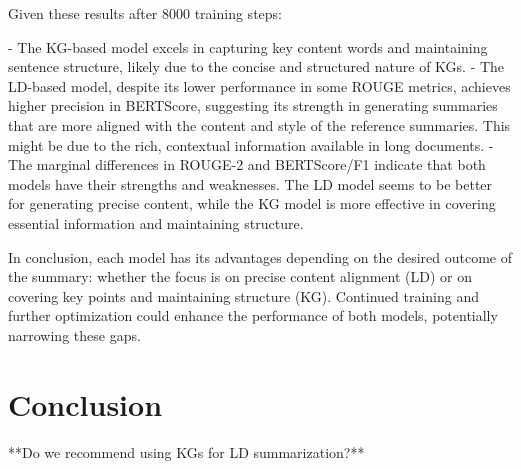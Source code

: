\documentclass[12pt]{article}
\begin{document}
Given these results after 8000 training steps:

- The KG-based model excels in capturing key content words and maintaining sentence structure, likely due to the concise and structured nature of KGs. 
- The LD-based model, despite its lower performance in some ROUGE metrics, achieves higher precision in BERTScore, suggesting its strength in generating summaries that are more aligned with the content and style of the reference summaries. This might be due to the rich, contextual information available in long documents.
- The marginal differences in ROUGE-2 and BERTScore/F1 indicate that both models have their strengths and weaknesses. The LD model seems to be better for generating precise content, while the KG model is more effective in covering essential information and maintaining structure.

In conclusion, each model has its advantages depending on the desired outcome of the summary: whether the focus is on precise content alignment (LD) or on covering key points and maintaining structure (KG). Continued training and further optimization could enhance the performance of both models, potentially narrowing these gaps.

\section{Conclusion}
**Do we recommend using KGs for LD summarization?**

\newpage
\printbibliography
\end{document}

